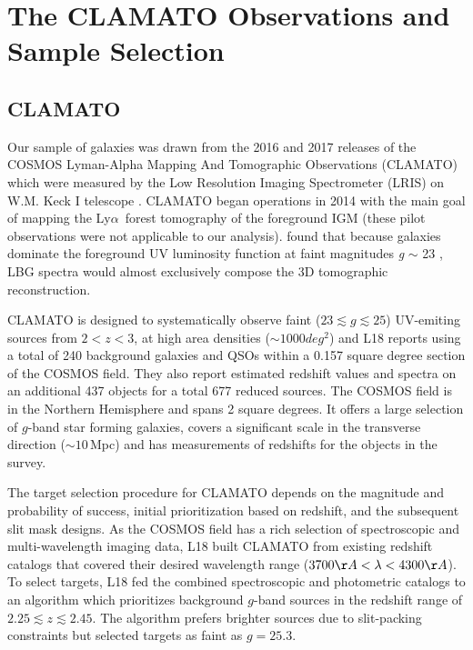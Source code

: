 \documentclass[twocolumn,tight,times]{aastex63}
\newcommand{\lya}{Ly$\alpha$}
\begin{document}
\section{The CLAMATO Observations and Sample Selection}
\subsection{CLAMATO}
\label{subsec:clamato}

Our sample of galaxies was drawn from the 2016 and 2017 releases of the COSMOS Lyman-Alpha Mapping And Tomographic Observations (CLAMATO) which were measured by the Low Resolution Imaging Spectrometer (LRIS) on W.M. Keck I telescope \citep{LRIS}. CLAMATO began operations in 2014 with the main goal of mapping the \lya\ forest tomography of the foreground IGM (these pilot observations were not applicable to our analysis). \cite{Lee_2014} found that because galaxies dominate the foreground UV luminosity function at faint magnitudes \textit{g} $\sim$ 23 \citep{Reddy_2008}, LBG spectra would almost exclusively compose the 3D tomographic reconstruction.

CLAMATO is designed to systematically observe faint ($23 \lesssim \textit{g} \lesssim 25$) UV-emiting sources from $2 < z < 3$, at high area densities ($\sim 1000 deg^{2}$) and L18 reports using a total of 240 background galaxies and QSOs within a 0.157 square degree section of the COSMOS field. They also report estimated redshift values and spectra on an additional 437 objects for a total 677 reduced sources. The COSMOS field \citep{Scoville_2007} is in the Northern Hemisphere and spans 2 square degrees. It offers a large selection of $g$-band star forming galaxies, covers a significant scale in the transverse direction ($\sim 10$\,Mpc) and has measurements of redshifts for the objects in the survey. 

The target selection procedure for CLAMATO depends on the magnitude and probability of success, initial prioritization based on redshift, and the subsequent slit mask designs. As the COSMOS field has a rich selection of spectroscopic and multi-wavelength imaging data, L18 built CLAMATO from existing redshift catalogs \cite{Lilly_2007, LeFevre_2015, Kriek_2015, Nanayakkara_2016} that covered their desired wavelength range ($3700\AA < \lambda < 4300\AA$). To select targets, L18 fed the combined spectroscopic and photometric catalogs to an algorithm which prioritizes background $g$-band sources in the redshift range of $2.25 \lesssim z \lesssim 2.45$. The algorithm prefers brighter sources due to slit-packing constraints but selected targets as faint as $g = 25.3$.
\end{document}
